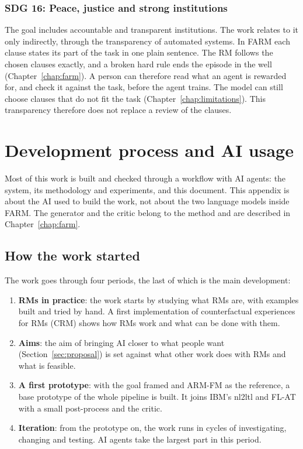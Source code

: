 \documentclass[11pt,english,listoffigures,listoftables]{tfgetsinf}
\begin{document}
\subsection{SDG 16: Peace, justice and strong institutions}
The goal includes accountable and transparent institutions. The work relates to it only indirectly, through the transparency of automated systems. In FARM each clause states its part of the task in one plain sentence. The RM follows the chosen clauses exactly, and a broken hard rule ends the episode in the well (Chapter~\ref{chap:farm}). A person can therefore read what an agent is rewarded for, and check it against the task, before the agent trains. The model can still choose clauses that do not fit the task (Chapter~\ref{chap:limitations}). This transparency therefore does not replace a review of the clauses.


\chapter{Development process and AI usage}
\label{app:dev-process}
Most of this work is built and checked through a workflow with AI agents: the system, its methodology and experiments, and this document. This appendix is about the AI used to build the work, not about the two language models inside FARM. The generator and the critic belong to the method and are described in Chapter~\ref{chap:farm}.

\section{How the work started}
\label{app:dev-start}
The work goes through four periods, the last of which is the main development:
\begin{enumerate}
    \item \textbf{RMs in practice}: the work starts by studying what RMs are, with examples built and tried by hand. A first implementation of counterfactual experiences for RMs (CRM) \cite{icarte2022reward} shows how RMs work and what can be done with them.
    \item \textbf{Aims}: the aim of bringing AI closer to what people want (Section~\ref{sec:proposal}) is set against what other work does with RMs and what is feasible.
    \item \textbf{A first prototype}: with the goal framed and ARM-FM as the reference, a base prototype of the whole pipeline is built. It joins IBM's nl2ltl and FL-AT with a small post-process and the critic.
    \item \textbf{Iteration}: from the prototype on, the work runs in cycles of investigating, changing and testing. AI agents take the largest part in this period.
\end{enumerate}
\end{document}
